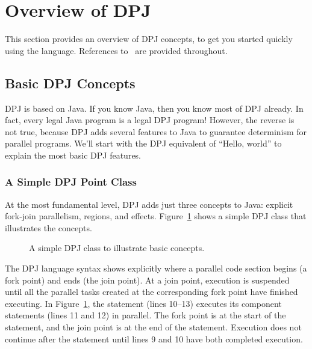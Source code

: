 \section{Overview of DPJ%
\label{sec:overview}}

This section provides an overview of DPJ concepts, to get you started
quickly using the language.  References to \ are provided
throughout.

\subsection{Basic DPJ Concepts%
\label{sec:overview:basic}}

DPJ is based on Java.  If you know Java, then you know most of DPJ
already.  In fact, every legal Java program is a legal DPJ program!
However, the reverse is not true, because DPJ adds several features to
Java to guarantee determinism for parallel programs.  We'll start with
the DPJ equivalent of ``Hello, world'' to explain the most basic DPJ
features.

\subsubsection{A Simple DPJ Point Class%
\label{sec:overview:basic:simple}}

At the most fundamental level, DPJ adds just three concepts to Java:
explicit fork-join parallelism, regions, and effects.
Figure~\ref{fig:overview} shows a simple DPJ class  that
illustrates the concepts.

\begin{figure}

\caption{A simple DPJ class to illustrate basic concepts.}
\label{fig:overview}
\end{figure}

 The DPJ language syntax shows
explicitly where a parallel code section begins (a fork point) and
ends (the join point).  At a join point, execution is suspended until
all the parallel tasks created at the corresponding fork point have
finished executing.  In Figure~\ref{fig:overview}, the 
statement (lines 10--13) executes its component statements (lines 11
and 12) in parallel.  The fork point is at the start of the
 statement, and the join point is at the end of the
statement.  Execution does not continue after the 
statement until lines 9 and 10 have both completed execution.

